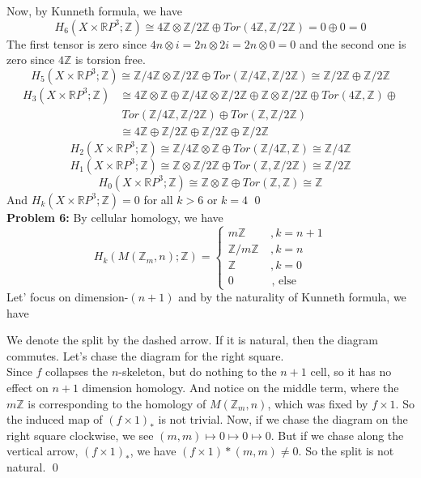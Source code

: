 \documentclass[12pt]{amsart}
\newcommand{\R}{\mathbb{R}}
\newcommand{\Z}{\mathbb{Z}}
\begin{document}
Now, by Kunneth formula, we have 
\[H_6(X\times \R P^3;\Z)\cong 4\Z\otimes \Z/2\Z\oplus Tor(4\Z,\Z/2\Z)=0\oplus 0=0\]
The first tensor is zero since $4n\otimes i=2n\otimes 2i=2n\otimes 0=0$ and the second one is zero since $4\Z$ is torsion free.
\[H_5(X\times \R P^3;\Z)\cong \Z/4\Z\otimes \Z/2\Z\oplus Tor(\Z/4\Z,\Z/2\Z)\cong \Z/2\Z\oplus \Z/2\Z\]
\begin{align*}
    H_3(X\times \R P^3;\Z)&\cong 4\Z\otimes \Z\oplus \Z/4\Z\otimes \Z/2\Z\oplus \Z\otimes \Z/2\Z\oplus Tor(4\Z,\Z)\oplus\\
    &\  Tor(\Z/4\Z,\Z/2\Z)\oplus   Tor(\Z,\Z/2\Z)\\
    &\cong 4\Z\oplus \Z/2\Z\oplus \Z/2\Z\oplus \Z/2\Z
\end{align*}
\[H_2(X\times \R P^3;\Z)\cong \Z/4\Z\otimes \Z\oplus Tor(\Z/4\Z,\Z)\cong \Z/4\Z\]
\[H_1(X\times \R P^3;\Z)\cong \Z\otimes \Z/2\Z\oplus Tor(\Z,\Z/2\Z)\cong \Z/2\Z\]
\[H_0(X\times \R P^3;\Z)\cong \Z\otimes \Z\oplus Tor(\Z,\Z)\cong \Z\]
And $H_k(X\times \R P^3;\Z)=0$ for all $k>6$ or $k=4$
\qed\\
\textbf{Problem 6:} By cellular homology, we have 
\[H_k(M(\Z_m,n);\Z)=\begin{cases}
    m\Z & \ ,k=n+1\\
    \Z/m\Z & \ ,k=n\\
    \Z& \ ,k=0\\
0 & \text{ , else}
\end{cases}
    \] Let' focus on dimension-$(n+1)$ and by the naturality of Kunneth formula, we have
    \begin{center}
                
    \end{center}
We denote the split by the dashed arrow. If it is natural, then the diagram commutes. Let's chase the diagram for the right square.\\
Since $f$ collapses the $n$-skeleton, but do nothing to the $n+1$ cell, so it has no effect on $n+1$ dimension homology. And notice on the middle term, where the $m\Z$ is corresponding to the homology of $M(\Z_m,n)$, which was fixed by $f\times 1$. So the induced map of $(f\times 1)_\ast$ is not trivial. Now, if we chase the diagram on the right square clockwise, we see $(m,m)\mapsto 0\mapsto 0\mapsto 0$. But if we chase along the vertical arrow, $(f\times 1)_\ast$, we have $(f\times 1)\ast(m,m)\neq 0$. So the split is not natural.
\qed\\
\end{document}
